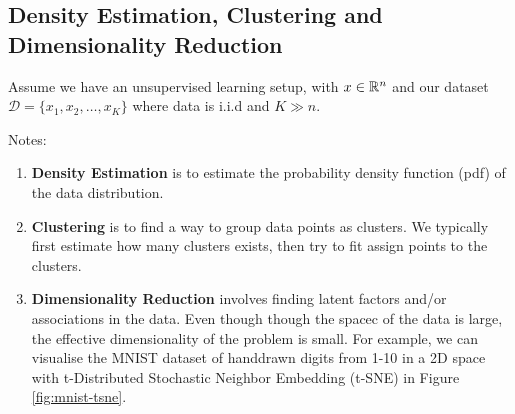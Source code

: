 \subsection{Density Estimation, Clustering and Dimensionality Reduction}

Assume we have an unsupervised learning setup, with $x \in \mathbb{R}^n$ and our dataset $\mathcal{D} = \{ x_1, x_2, \ldots, x_K \}$ where data is i.i.d and  $K \gg n$.

Notes:
\begin{enumerate}
    \item  \textbf{Density Estimation} is to estimate the probability density function (pdf) of the data distribution.
    \item  \textbf{Clustering} is to find a way to group data points as clusters. We typically first estimate how many clusters exists, then try to fit assign points to the clusters.
    \item \textbf{Dimensionality Reduction} involves finding latent factors and/or associations in the data. Even though though the spacec of the data is large, the effective dimensionality of the problem is small. For example, we can visualise the MNIST dataset of handdrawn digits from 1-10 in a 2D space with t-Distributed Stochastic Neighbor Embedding (t-SNE) in Figure \ref{fig:mnist-tsne}.


\end{enumerate}
